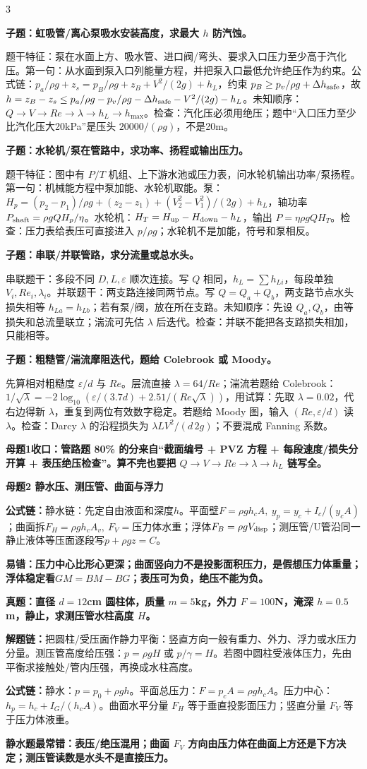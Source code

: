 \documentclass[a4paper]{article}
\newcommand{\mt}[1]{\vspace{0.12pt}\colorbox{M}{\parbox{\dimexpr\linewidth-2\fboxsep}{\color{white}\bfseries #1}}\par}
\newcommand{\qt}[1]{\vspace{0.04pt}\colorbox{Q}{\parbox{\dimexpr\linewidth-2\fboxsep}{\color{white}\bfseries #1}}\par}
\newcommand{\ans}[1]{\colorbox{G}{\parbox{\dimexpr\linewidth-2\fboxsep}{#1}}\par}
\newcommand{\warn}[1]{\colorbox{Y}{\parbox{\dimexpr\linewidth-2\fboxsep}{\color{E}\bfseries #1}}\par}
\newcommand{\chain}[1]{{\color{A}\bfseries 解题链：}#1\par}
\newcommand{\form}[1]{{\color{M}\bfseries 公式链：}#1\par}
\begin{document}
\begin{multicols}{3}
\qt{子题：虹吸管/离心泵吸水安装高度，求最大 $h$ 防汽蚀。}
\ans{题干特征：泵在水面上方、吸水管、进口阀/弯头、要求入口压力至少高于汽化压。第一句：从水面到泵入口列能量方程，并把泵入口最低允许绝压作为约束。公式链：$p_a/\rho g+z_s=p_B/\rho g+z_B+V^2/(2g)+h_L$，约束 $p_B\ge p_v/\rho g+\Delta h_{\rm safe}$，故 $h=z_B-z_s\le p_a/\rho g-p_v/\rho g-\Delta h_{\rm safe}-V^2/(2g)-h_L$。未知顺序：$Q\to V\to Re\to\lambda\to h_L\to h_{\max}$。检查：汽化压必须用绝压；题中“入口压力至少比汽化压大20kPa”是压头 $20000/(\rho g)$，不是20m。}
\qt{子题：水轮机/泵在管路中，求功率、扬程或输出压力。}
\ans{题干特征：图中有 $P/T$ 机组、上下游水池或压力表，问水轮机输出功率/泵扬程。第一句：机械能方程中泵加能、水轮机取能。泵：$H_p=(p_2-p_1)/\rho g+(z_2-z_1)+(V_2^2-V_1^2)/(2g)+h_L$，轴功率 $P_{\rm shaft}=\rho gQH_p/\eta$。水轮机：$H_T=H_{\rm up}-H_{\rm down}-h_L$，输出 $P=\eta\rho gQH_T$。检查：压力表给表压可直接进入 $p/\rho g$；水轮机不是加能，符号和泵相反。}
\qt{子题：串联/并联管路，求分流量或总水头。}
\ans{串联题干：多段不同 $D,L,\varepsilon$ 顺次连接。写 $Q$ 相同，$h_L=\sum h_{Li}$，每段单独 $V_i,Re_i,\lambda_i$。并联题干：两支路连接同两节点。写 $Q=Q_a+Q_b$，两支路节点水头损失相等 $h_{La}=h_{Lb}$；若有泵/阀，放在所在支路。未知顺序：先设 $Q_a,Q_b$，由等损失和总流量联立；湍流可先估 $\lambda$ 后迭代。检查：并联不能把各支路损失相加，只能相等。}
\qt{子题：粗糙管/湍流摩阻迭代，题给 Colebrook 或 Moody。}
\ans{先算相对粗糙度 $\varepsilon/d$ 与 $Re$。层流直接 $\lambda=64/Re$；湍流若题给 Colebrook：$1/\sqrt{\lambda}=-2\log_{10}(\varepsilon/(3.7d)+2.51/(Re\sqrt{\lambda}))$，用试算：先取 $\lambda=0.02$，代右边得新 $\lambda$，重复到两位有效数字稳定。若题给 Moody 图，输入 $(Re,\varepsilon/d)$ 读 $\lambda$。检查：Darcy $\lambda$ 的沿程损失为 $\lambda L V^2/(d\,2g)$；不要混成 Fanning 系数。}
\warn{母题1收口：管路题 80\% 的分来自“截面编号 + PVZ 方程 + 每段速度/损失分开算 + 表压绝压检查”。算不完也要把 $Q\to V\to Re\to\lambda\to h_L$ 链写全。}

\mt{母题2 静水压、测压管、曲面与浮力}
\form{静水链：先定自由液面和深度$h$。平面壁$F=\rho gh_cA,\ y_p=y_c+I_c/(y_cA)$；曲面拆$F_H=\rho gh_cA_v,\ F_V=$压力体水重；浮体$F_B=\rho gV_{\rm disp}$；测压管/U管沿同一静止液体等压面逐段写$p+\rho gz=C$。}
\warn{易错：压力中心比形心更深；曲面竖向力不是投影面积压力，是假想压力体重量；浮体稳定看$GM=BM-BG$；表压可为负，绝压不能为负。}
\qt{真题：直径 $d=12$cm 圆柱体，质量 $m=5$kg，外力 $F=100$N，淹深 $h=0.5$m，静止，求测压管水柱高度 $H$。}
\chain{把圆柱/受压面作静力平衡：竖直方向一般有重力、外力、浮力或水压力分量。测压管高度给压强：$p=\rho gH$ 或 $p/\gamma=H$。若图中圆柱受液体压力，先由平衡求接触处/管内压强，再换成水柱高度。}
\form{静水：$p=p_0+\rho gh$。平面总压力：$F=p_cA=\rho gh_cA$。压力中心：$h_p=h_c+I_G/(h_cA)$。曲面水平分量 $F_H$ 等于垂直投影面压力；竖直分量 $F_V$ 等于压力体液重。}
\warn{静水题最常错：表压/绝压混用；曲面 $F_V$ 方向由压力体在曲面上方还是下方决定；测压管读数是水头不是直接压力。}


\end{multicols}
\end{document}
